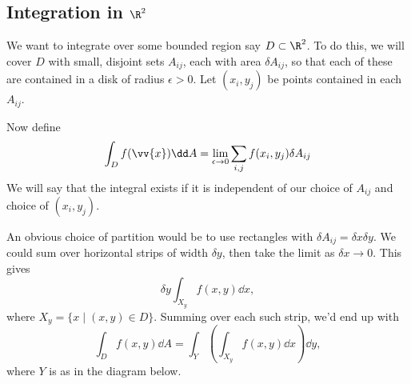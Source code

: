 \subsection{Integration in $\R^2$}

We want to integrate over some bounded region say $D \subset \R^2$. To do this, we will cover $D$ with small, disjoint sets $A_{ij}$, each with area $\delta A_{ij}$, so that each of these are contained in a disk of radius $\epsilon > 0$.
Let $(x_i, y_j)$ be points contained in each $A_{ij}$.

Now define
$$
	\int_D f(\vv{x}) \dd A = \lim_{\epsilon \to 0} \sum_{i,j} f(x_i, y_j) \delta A_{ij}
$$
We will say that the integral exists if it is independent of our choice of $A_{ij}$ and choice of $(x_i, y_j)$.

An obvious choice of partition would be to use rectangles with $\delta A_{ij} = \delta x \delta y$. We could sum over horizontal strips of width $\delta y$, then take the limit as $\delta x \rightarrow 0$. This gives
$$
	\delta y \int_{X_y} f(x, y) \dd x,
$$
where $X_y = \{x \mid (x, y) \in D \}$. Summing over each such strip, we'd end up with
$$
\int_{D} f(x, y) \dd A = \int_Y \left(\int_{X_y} f(x, y) \dd x\right) \dd y,
$$
where $Y$ is as in the diagram below.

